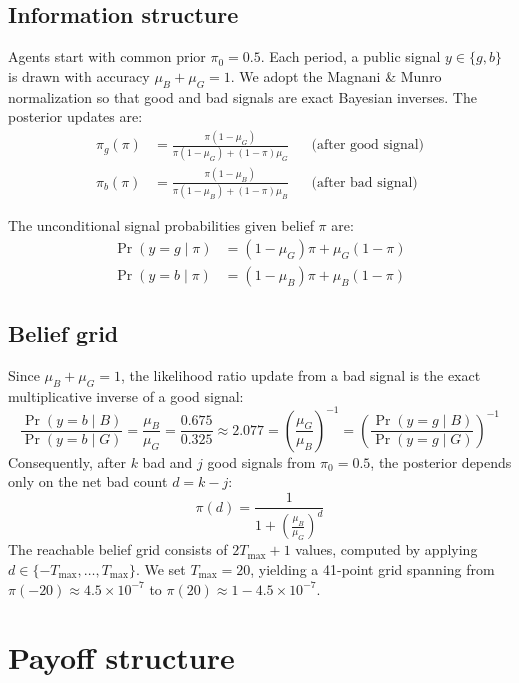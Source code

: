 \documentclass[11pt]{article}
\begin{document}
\subsection{Information structure}

Agents start with common prior $\pi_0 = 0.5$. Each period, a public signal
$y \in \{g, b\}$ is drawn with accuracy $\mu_B + \mu_G = 1$. We adopt the
Magnani \& Munro normalization so that good and bad signals are exact Bayesian
inverses. The posterior updates are:
%
\begin{align}
    \pi_g(\pi) &= \frac{\pi(1-\mu_G)}{\pi(1-\mu_G) + (1-\pi)\mu_G}
    & &\text{(after good signal)} \label{eq:pi_good} \\[4pt]
    \pi_b(\pi) &= \frac{\pi(1-\mu_B)}{\pi(1-\mu_B) + (1-\pi)\mu_B}
    & &\text{(after bad signal)} \label{eq:pi_bad}
\end{align}

The unconditional signal probabilities given belief $\pi$ are:
\begin{align}
    \Pr(y = g \mid \pi) &= (1-\mu_G)\pi + \mu_G(1-\pi) \label{eq:prob_good} \\
    \Pr(y = b \mid \pi) &= (1-\mu_B)\pi + \mu_B(1-\pi) \label{eq:prob_bad}
\end{align}

\subsection{Belief grid}

Since $\mu_B + \mu_G = 1$, the likelihood ratio update from a bad signal is
the exact multiplicative inverse of a good signal:
\[
    \frac{\Pr(y=b \mid B)}{\Pr(y=b \mid G)} = \frac{\mu_B}{\mu_G}
    = \frac{0.675}{0.325} \approx 2.077
    = \left(\frac{\mu_G}{\mu_B}\right)^{-1}
    = \left(\frac{\Pr(y=g \mid B)}{\Pr(y=g \mid G)}\right)^{-1}
\]
Consequently, after $k$ bad and $j$ good signals from $\pi_0 = 0.5$, the
posterior depends only on the net bad count $d = k - j$:
\[
    \pi(d) = \frac{1}{1 + \left(\frac{\mu_B}{\mu_G}\right)^d}
\]
The reachable belief grid consists of $2T_{\max} + 1$ values, computed by
applying $d \in \{-T_{\max}, \ldots, T_{\max}\}$. We set $T_{\max} = 20$,
yielding a 41-point grid spanning from $\pi(-20) \approx 4.5 \times 10^{-7}$
to $\pi(20) \approx 1 - 4.5 \times 10^{-7}$.

\section{Payoff structure}
\end{document}
